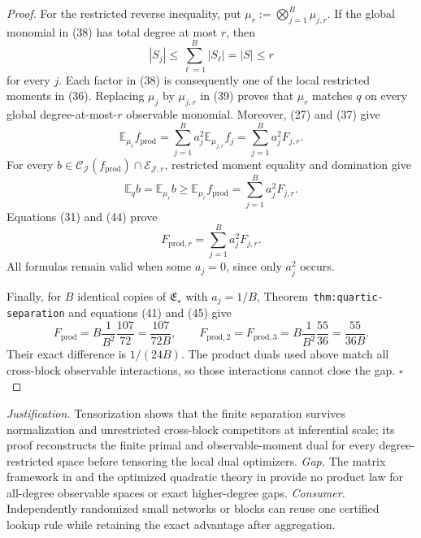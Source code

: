\documentclass{article}
\begin{document}
\begin{proof}
For the restricted reverse inequality, put \(\mu_r:=\bigotimes_{j=1}^B\mu_{j,r}\).  If the global monomial in (38) has total degree at most \(r\), then
\[
|S_j|\le\sum_{\ell=1}^B|S_\ell|=|S|\le r
\tag{42}
\]
for every \(j\).  Each factor in (38) is consequently one of the local restricted moments in (36).  Replacing \(\mu_j\) by \(\mu_{j,r}\) in (39) proves that \(\mu_r\) matches \(q\) on every global degree-at-most-\(r\) observable monomial.  Moreover, (27) and (37) give
\[
\mathbb E_{\mu_r}f_{\mathrm{prod}}
=\sum_{j=1}^Ba_j^2\mathbb E_{\mu_{j,r}}f_j
=\sum_{j=1}^Ba_j^2F_{j,r}.
\tag{43}
\]
For every \(b\in\mathcal C_{\mathcal J}(f_{\mathrm{prod}})\cap\mathcal E_{\mathcal J,r}\), restricted moment equality and domination give
\[
\mathbb E_qb=\mathbb E_{\mu_r}b
\ge\mathbb E_{\mu_r}f_{\mathrm{prod}}
=\sum_{j=1}^Ba_j^2F_{j,r}.
\tag{44}
\]
Equations (31) and (44) prove
\[
F_{\mathrm{prod},r}=\sum_{j=1}^Ba_j^2F_{j,r}.
\tag{45}
\]
All formulas remain valid when some \(a_j=0\), since only \(a_j^2\) occurs.

Finally, for \(B\) identical copies of \(\mathfrak E_\star\) with \(a_j=1/B\), Theorem~\texttt{thm:quartic-separation} and equations (41) and (45) give
\[
F_{\mathrm{prod}}
=B\frac1{B^2}\frac{107}{72}
=\frac{107}{72B},
\qquad
F_{\mathrm{prod},2}=F_{\mathrm{prod},3}
=B\frac1{B^2}\frac{55}{36}
=\frac{55}{36B}.
\tag{46}
\]
Their exact difference is \(1/(24B)\).  The product duals used above match all cross-block observable interactions, so those interactions cannot close the gap. \(\square\)
\end{proof}
\par\smallskip\noindent \textit{Justification.} Tensorization shows that the finite separation survives normalization and unrestricted cross-block competitors at inferential scale; its proof reconstructs the finite primal and observable-moment dual for every degree-restricted space before tensoring the local dual optimizers. \textit{Gap.} The matrix framework in \cite{Middleton2021Unifying} and the optimized quadratic theory in \cite{HarshawMiddletonSavje2026} provide no product law for all-degree observable spaces or exact higher-degree gaps. \textit{Consumer.} Independently randomized small networks or blocks can reuse one certified lookup rule while retaining the exact advantage after aggregation.
\end{document}
